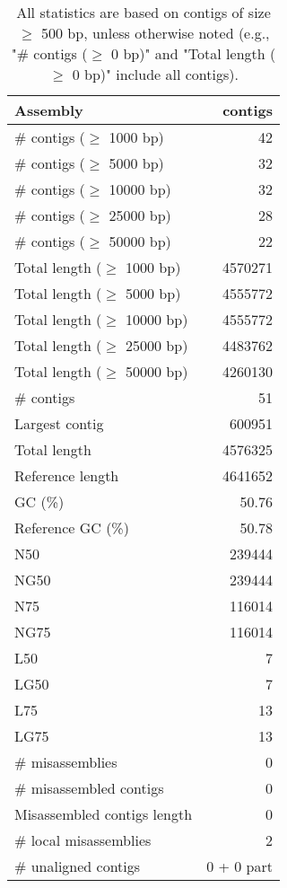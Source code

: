 \documentclass[12pt,a4paper]{article}
\begin{document}
\begin{table}[ht]
\begin{center}
\caption{All statistics are based on contigs of size $\geq$ 500 bp, unless otherwise noted (e.g., "\# contigs ($\geq$ 0 bp)" and "Total length ($\geq$ 0 bp)" include all contigs).}
\begin{tabular}{|l*{1}{|r}|}
\hline
Assembly & contigs \\ \hline
\# contigs ($\geq$ 1000 bp) & 42 \\ \hline
\# contigs ($\geq$ 5000 bp) & 32 \\ \hline
\# contigs ($\geq$ 10000 bp) & 32 \\ \hline
\# contigs ($\geq$ 25000 bp) & 28 \\ \hline
\# contigs ($\geq$ 50000 bp) & 22 \\ \hline
Total length ($\geq$ 1000 bp) & 4570271 \\ \hline
Total length ($\geq$ 5000 bp) & 4555772 \\ \hline
Total length ($\geq$ 10000 bp) & 4555772 \\ \hline
Total length ($\geq$ 25000 bp) & 4483762 \\ \hline
Total length ($\geq$ 50000 bp) & 4260130 \\ \hline
\# contigs & 51 \\ \hline
Largest contig & 600951 \\ \hline
Total length & 4576325 \\ \hline
Reference length & 4641652 \\ \hline
GC (\%) & 50.76 \\ \hline
Reference GC (\%) & 50.78 \\ \hline
N50 & 239444 \\ \hline
NG50 & 239444 \\ \hline
N75 & 116014 \\ \hline
NG75 & 116014 \\ \hline
L50 & 7 \\ \hline
LG50 & 7 \\ \hline
L75 & 13 \\ \hline
LG75 & 13 \\ \hline
\# misassemblies & 0 \\ \hline
\# misassembled contigs & 0 \\ \hline
Misassembled contigs length & 0 \\ \hline
\# local misassemblies & 2 \\ \hline
\# unaligned contigs & 0 + 0 part \\ \hline

\end{tabular}
\end{center}
\end{table}
\end{document}

